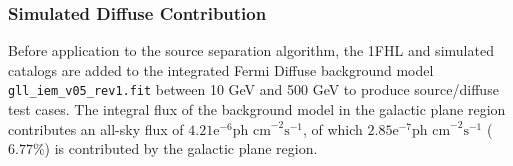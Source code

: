 \documentclass{PoS}
\begin{document}
\begin{table}
\centering
{}
\caption{Parameters for 10 - 500 GeV Galaxy Population Simulations.}
\end{table}

\subsubsection{Simulated Diffuse Contribution}

Before application to the source separation algorithm, the 1FHL and simulated catalogs are added to the integrated Fermi Diffuse background model \verb|gll_iem_v05_rev1.fit| between 10 GeV and 500 GeV to produce source/diffuse test cases. The integral flux of the background model in the galactic plane region contributes an all-sky flux of $4.21\text{e}^{-6} \text{ph cm}^{-2}\text{s}^{-1}$, of which $2.85\text{e}^{-7} \text{ph cm}^{-2}\text{s}^{-1}$ ($6.77\%$) is contributed by the galactic plane region.

\begin{table}
\centering
{}
\caption{Galactic plane fluxes for source population catalogs.}
\end{table}
\end{document}
